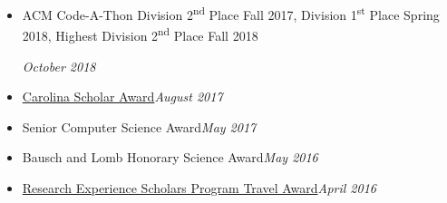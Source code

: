 \documentclass[\ifdefined\cv10pt\else11pt\fi,letterpaper]{moderncv}
\newcommand{\cvonly}[1]{\ifdefined\cv#1\fi\ignorespaces}
\renewcommand{\cvitem}[2]{\item {#1}\hfill\textit{#2}}
\newcommand{\st}{\textsuperscript{st}\xspace}
\newcommand{\nd}{\textsuperscript{nd}\xspace}
\let\oldsection\section
\renewcommand{\section}[1]{\vspace*{-1.3ex}\oldsection{#1}\vspace*{-0.5ex}}
\begin{document}
\begin{itemize}
{		}
		\cvonly{\cvitem{\parbox[t]{0.75\linewidth}{ACM Code-A-Thon Division 2\nd Place Fall 2017, Division 1\st Place Spring 2018, Highest Division 2\nd Place Fall 2018}\vspace*{0.6ex}}{October 2018}}
		\cvitem{\href{https://sc.edu/about/offices_and_divisions/undergraduate_admissions/honors_and_scholars_programs/top_scholars/}{Carolina Scholar Award}}{August 2017}
		\cvonly{\cvitem{Senior Computer Science Award}{May 2017}}
		\cvonly{\cvitem{Bausch and Lomb Honorary Science Award}{May 2016}}
		\cvonly{\cvitem{\href{https://www.scgssm.org/residential/academics/senior-research}{Research Experience Scholars Program Travel Award}}{April 2016}}
	\end{itemize}
	
\end{document}
